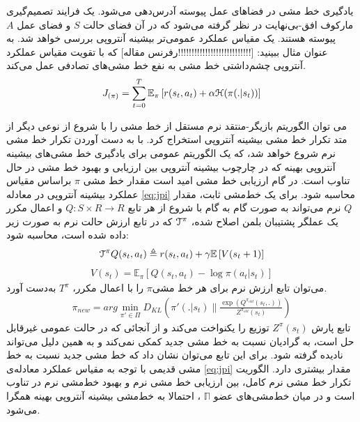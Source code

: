 یادگیری خط مشی در فضاهای عمل پیوسته آدرس‌دهی می‌شود. یک فرایند تصمیم‌گیری مارکوف افق-بی‌نهایت
 در نظر گرفته می‌شود که در آن فضای حالت
  $S$
   و فضای عمل
   $A$
    پیوسته هستند.
یک مقیاس عملکرد عمومی‌تر بیشینه آنتروپی بررسی خواهد شد.
به عنوان مثال ببینید: 
[!!!!!!!!!!!!!!!!!!!!!!!!!!!رفرنس مقاله]
که با تقویت مقیاس عملکرد آنتروپی چشم‌داشتی خط مشی به نفع خط مشی‌های تصادفی عمل می‌کند.
\begin{align}
J_{(\pi)}= \sum\limits_{t=0}^T \mathbb{E}_\pi \left[ r(s_t , a_t) + \alpha \EuScript{H} (\pi(.|s_t)) \right]
\label{eq:jpi}
\end{align}

می توان الگوریتم بازیگر-منتقد نرم مستقل از خط مشی را با شروع از نوعی دیگر از متد تکرار خط مشی بیشینه آنتروپی استخراج کرد.
با به دست آوردن تکرار خط مشی نرم شروع خواهد شد، که یک الگوریتم عمومی برای یادگیری خط مشی‌های بیشینه آنتروپی بهینه که در چارچوب بیشینه آنتروپی بین ارزیابی و بهبود خط مشی در حال تناوب است.
در گام ارزیابی خط مشی امید است مقدار خط مشی
$\pi$
 براساس مقیاس عملکرد بیشینه آنتروپی در معادله \ref{eq:jpi} محاسبه شود. برای یک خط‌مشی ثابت، مقدار $Q$  نرم می‌تواند به صورت گام به گام با شروع از هر تابع
  $Q:S \times R \rightarrow R$ 
 و اعمال مکرر یک عملگر پشتیبان بلمن اصلاح شده،
 $\EuScript{T}^\pi$
  که در تابع ارزش حالت نرم به صورت زیر داده شده است، محاسبه شود:
\begin{align}
\EuScript{T}^\pi Q(s_t,a_t) \triangleq r(s_t,a_t)+\gamma \mathbb{E} \left[ V(s_t+1) \right]
\label{eq:tpi}
\end{align}
\begin{align}
V(s_t)= \mathbb{E}_\pi \left[ Q(s_t,a_t)- \log \pi(a_t | s_t) \right]
\end{align}
می‌توان تابع ارزش نرم برای هر خط مشی$\pi$ را با اعمال مکرر، $T^\pi$ به‌دست آورد.
\begin{align}
\pi_{new} = arg \min_{\pi' \in \Pi} D_{KL}  \left( \pi'(.|s_t) \parallel \frac{\exp{(Q^{\pi_{old}} (s_t,.))}}{Z^{\pi_{old}} (s_t)}\right)
\label{eq:pinew}
\end{align}
تابع پارش 
$Z^\pi (s_t)$
توزیع را یکنواخت می‌کند و از آنجائی که در حالت عمومی غیرقابل حل است، به گرادیان نسبت به خط مشی جدید کمکی نمی‌کند و به همین دلیل می‌تواند نادیده گرفته شود. برای این تابع می‌توان نشان داد که خط مشی جدید نسبت به خط مشی قدیمی با توجه به مقیاس عملکرد معادله‌ی \ref{eq:jpi} مقدار بیشتری دارد. 
الگوریت تکرار خط مشی نرم کامل، بین ارزیابی خط مشی نرم و بهبود خط‌مشی نرم در تناوب است و در میان خط‌مشی‌های عضو
$\mathbb{\Pi}$
، احتمالا به خط‌مشی بیشینه آنتروپی بهینه همگرا می‌شود.
